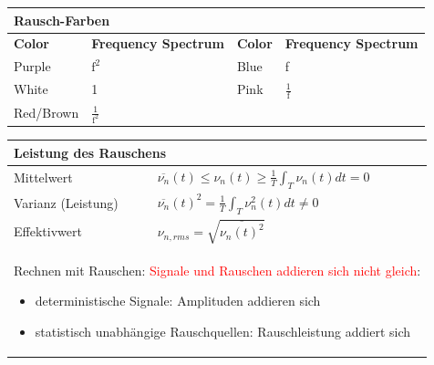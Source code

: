 \vspace{-2.5\topsep}
\begin{longtable}{|p{4.27cm}p{4.27cm}|p{4.27cm}p{4.27cm}|}
    \hline
    \multicolumn{4}{|l|}{\bf Rausch-Farben}
    \\ \hline
    \textbf{Color} & \textbf{Frequency Spectrum} & \textbf{Color} & \textbf{Frequency Spectrum}
    \\ \hline
    Purple         & $\mathrm{f^2}$              & Blue           & f\\
    White          & 1                           & Pink           & $\mathrm{\frac{1}{f}}$\\
    Red/Brown      & $\mathrm{\frac{1}{f^2}}$    &                & \\
    \hline
\end{longtable}
\vspace{-2.5\topsep}
\renewcommand{\arraystretch}{1.8}
\begin{longtable}{|p{5cm}|p{12.9cm}|}
    \hline
    \multicolumn{2}{|l|}{\bf Leistung des Rauschens}
    \\ \hline
    Mittelwert	
    & $\overline{\nu_{n}}(t)\leq \nu_{n}(t)\geq \frac{1}{T}\int_{T}\nu_{n}(t)dt=0$ 
    \\ \hline
    Varianz (Leistung)
    & $\overline{\nu_{n}}(t)^2=\frac{1}{T}\int_{T}\nu^2_{n}(t)dt\neq0$
    \\ \hline
    Effektivwert
    & $\nu_{n,rms}=\sqrt{\overline{\nu_{n}(t)^2}}$
    \\ \hline
    \multicolumn{2}{|l|}{\parbox{17.9cm}{\vspace{2mm}
        Rechnen mit Rauschen: \textcolor{red}{Signale und Rauschen addieren sich nicht gleich}:
        \begin{itemize}
            \item deterministische Signale: Amplituden addieren sich
            \item statistisch unabhängige Rauschquellen: Rauschleistung addiert sich
        \end{itemize}\vspace{2mm}}}
    \\ \hline
\end{longtable}
\vspace{-2.5\topsep}
